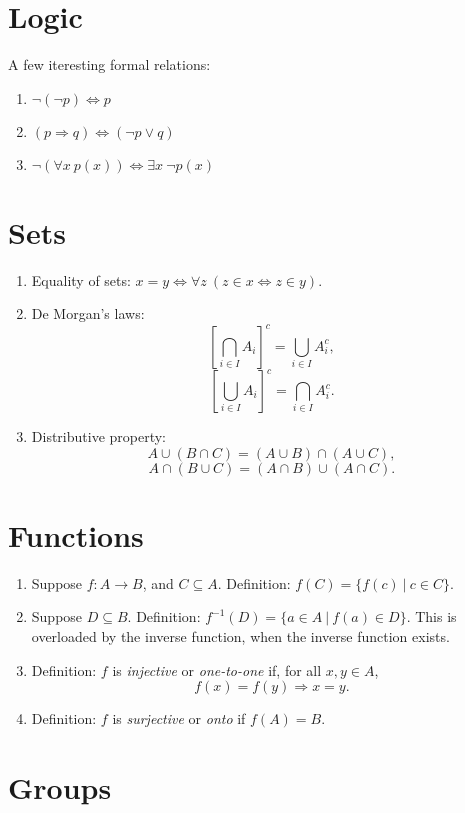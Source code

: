 \documentclass[12pt, a4paper]{article}
\begin{document}
\section{Logic}
A few iteresting formal relations:
\begin{enumerate}
    \item $\neg (\neg p) \Leftrightarrow p$
    \item $(p \Rightarrow q) \Leftrightarrow (\neg p \vee q)$
    \item $\neg (\forall x \ p(x)) \Leftrightarrow \exists x \ \neg p(x) $
\end{enumerate}

\section{Sets}
\begin{enumerate}
    \item Equality of sets: $x = y \Leftrightarrow \forall z \ (z \in x \Leftrightarrow z \in y)$.
    \item De Morgan's laws:
        \[ \left[ \bigcap _{i\in I}A_{i} \right] ^{c} = \bigcup _{i\in I}{A_{i}^{c}}, \]
        \[ \left[ \bigcup _{i\in I}A_{i} \right] ^{c} = \bigcap _{i\in I}{A_{i}^{c}}. \]
    \item Distributive property:
        \[ A \cup (B \cap C) = (A \cup B) \cap (A \cup C), \]
        \[ A \cap (B \cup C) = (A \cap B) \cup (A \cap C). \]
\end{enumerate}

\section{Functions}
\begin{enumerate}
    \item Suppose $f \colon A \to B$, and $C \subseteq A$.
        Definition: $f(C) = \{ f(c) \ | \ c \in C \}$.
    \item Suppose $D \subseteq B$. Definition: $f^{-1}(D) = \{ a \in A \ | \ f(a) \in D \}$.
        This is overloaded by the inverse function, when the inverse function exists.
    \item Definition: $f$ is \textit{injective} or \textit{one-to-one} if, for all $x, y \in A$,
        \[ f(x) = f(y) \Rightarrow x = y. \]
    \item Definition: $f$ is \textit{surjective} or \textit{onto} if $f(A) = B$.
\end{enumerate}
\section{Groups}
\end{document}

